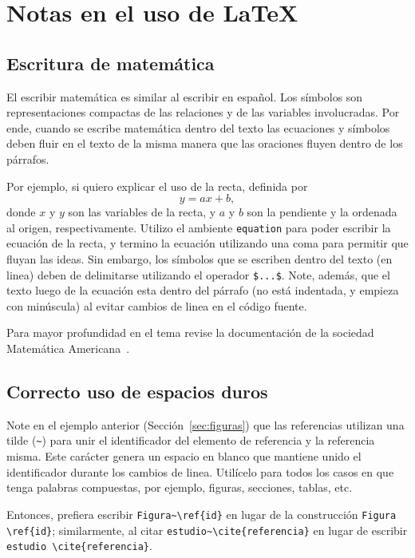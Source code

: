 \documentclass[twocolumn,11pts]{IEEEtran}
\begin{document}
\section{Notas en el uso de \LaTeX}
\subsection{Escritura de matemática}
El escribir matemática es similar al escribir en español. Los símbolos son representaciones compactas de las relaciones y de las variables involucradas. Por ende, cuando se escribe matemática dentro del texto las ecuaciones y símbolos deben fluir en el texto de la misma manera que las oraciones fluyen dentro de los párrafos.

Por ejemplo, si quiero explicar el uso de la recta, definida por
\begin{equation}
y = ax + b,
\end{equation}
donde $x$ y $y$ son las variables de la recta, y $a$ y $b$ son la pendiente y la ordenada al origen, respectivamente. Utilizo el ambiente \verb|equation| para poder escribir la ecuación de la recta, y termino la ecuación utilizando una coma para permitir que fluyan las ideas. Sin embargo, los símbolos que se escriben dentro del texto (en linea) deben de delimitarse utilizando el operador \verb|$...$|. Note, además, que el texto luego de la ecuación esta dentro del párrafo (no está indentada, y empieza con minúscula) al evitar cambios de linea en el código fuente.

Para mayor profundidad en el tema revise la documentación de la sociedad Matemática Americana~\cite{Downes2002}.

\subsection{Correcto uso de espacios duros}
Note en el ejemplo anterior (Sección~\ref{sec:figuras}) que las referencias utilizan una tilde (\verb|~|) para unir el identificador del elemento de referencia y la referencia misma. Este carácter genera un espacio en blanco que mantiene unido el identificador durante los cambios de linea. Utilícelo para todos los casos en que tenga palabras compuestas, por ejemplo, figuras, secciones, tablas, etc.

Entonces, prefiera escribir \verb|Figura~\ref{id}| en lugar de la construcción \verb|Figura \ref{id}|; similarmente, al citar \verb|estudio~\cite{referencia}| en lugar de escribir \verb|estudio \cite{referencia}|.
\end{document}
